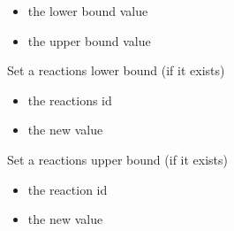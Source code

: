 \documentclass[letterpaper,10pt,english]{sphinxmanual}
\begin{document}
\begin{fulllineitems}
\begin{fulllineitems}
\begin{itemize}
\item {} 
\sphinxAtStartPar
{} the lower bound value

\item {} 
\sphinxAtStartPar
{} the upper bound value

\end{itemize}

\end{fulllineitems}


\begin{fulllineitems}
\label{\detokenize{modules_doc:cbmpy.CBModel.Model.setReactionLowerBound}}
\pysigstartsignatures
{}
\pysigstopsignatures
\sphinxAtStartPar
Set a reactions lower bound (if it exists)
\begin{itemize}
\item {} 
\sphinxAtStartPar
{} the reactions id

\item {} 
\sphinxAtStartPar
{} the new value

\end{itemize}

\end{fulllineitems}


\begin{fulllineitems}
\label{\detokenize{modules_doc:cbmpy.CBModel.Model.setReactionUpperBound}}
\pysigstartsignatures
{}
\pysigstopsignatures
\sphinxAtStartPar
Set a reactions upper bound (if it exists)
\begin{itemize}
\item {} 
\sphinxAtStartPar
{} the reaction id

\item {} 
\sphinxAtStartPar
{} the new value

\end{itemize}


\end{fulllineitems}
\end{fulllineitems}
\end{document}
